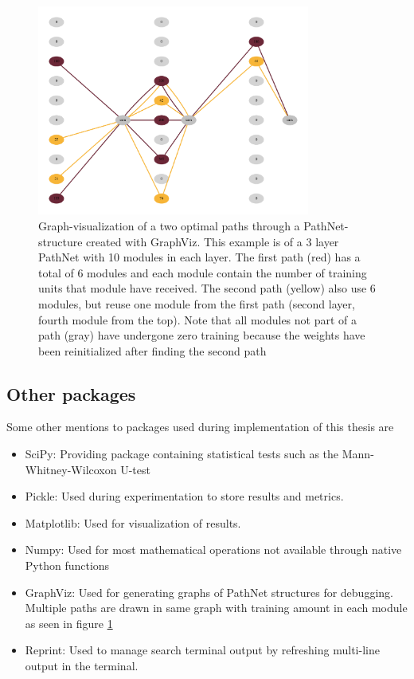 \begin{figure}[ht]
    \centering
    \includegraphics[width=0.8\textwidth]{Chapters/3.Implementation/figures/pathnet_visualization.pdf}
    \caption{Graph-visualization of a two optimal paths through a PathNet-structure created with GraphViz. This example is of a 3 layer PathNet with 10 modules in each layer. The first path (red) has a total of 6 modules and each module contain the number of training units that module have received. The second path (yellow) also use 6 modules, but reuse one module from the first path (second layer, fourth module from the top). Note that all modules not part of a path (gray) have undergone zero training because the weights have been reinitialized after finding the second path}
    \label{fig:pathnetexample}
\end{figure}

\subsection{Other packages}
Some other mentions to packages used during implementation of this thesis are
\begin{itemize}
    \item SciPy: Providing package containing statistical tests such as the Mann-Whitney-Wilcoxon U-test
    \item Pickle: Used during experimentation to store results and metrics.
    \item Matplotlib: Used for visualization of results.
    \item Numpy: Used for most mathematical operations not available through native Python functions 
    \item GraphViz: Used for generating graphs of PathNet structures for debugging. Multiple paths are drawn in same graph with training amount in each module as seen in figure \ref{fig:pathnetexample}
    \item Reprint: Used to manage search terminal output by refreshing multi-line output in the terminal.
\end{itemize}


